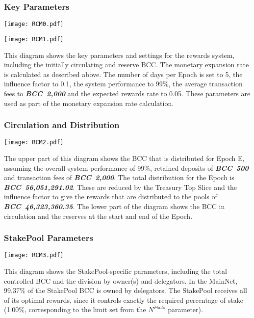 \documentclass[11pt,a4paper,dvipsnames,twosided,final]{article}
\newcommand{\bcc}{BCC{}}
\newcommand{\BCC}[1]{\textbf{\emph{\bcc~{#1}}}}
\newcommand{\bcc}[1]{Bcc}
\begin{document}
\subsubsection*{Key Parameters}

\hspace{-0.65in}\begin{minipage}{\textwidth}
\noindent\texttt{[image: RCM0.pdf]}
\vspace{-7in}

\noindent\texttt{[image: RCM1.pdf]}
\vspace{-3in}
\end{minipage}

\noindent
This diagram shows the key parameters and settings for the rewards system, including the initially
circulating and reserve \bcc{}.  The monetary expansion rate is calculated as described above.
The number of days per Epoch is set to 5, the influence factor to 0.1, the system performance
to 99\%, the average transaction fees to \BCC{2,000} and the expected rewards rate to 0.05.
These parameters are used as part of the monetary expansion rate calculation.


\subsubsection*{Circulation and Distribution}

\hspace{-0.65in}
\texttt{[image: RCM2.pdf]}

\noindent
The upper part of this diagram shows the \bcc{} that is distributed for Epoch E, assuming the overall system performance of 99\%,
retained deposits of \BCC{500} and transaction fees of \BCC{2,000}.  The total distribution for the
Epoch is \BCC{56,051,291.02}.  These are reduced by the Treasury Top Slice and the influence factor
to give the rewards that are distributed to the pools of \BCC{46,323,360.35}.
%
The lower part of the diagram shows the \bcc{} in circulation and the reserves at the start and end of the Epoch.

\subsubsection*{StakePool Parameters}

\hspace{-0.65in}
\texttt{[image: RCM3.pdf]}

\noindent
This diagram shows the StakePool-specific parameters, including the total controlled \bcc{} and the
division by owner(s) and delegators.  In the MainNet, 99.37\% of the StakePool \bcc{} is owned
by delegators.  The StakePool receives all of its optimal rewards, since it controls
exactly the required percentage of stake (1.00\%, corresponding to the limit set from
the $N^{\textit{Pools}}$ parameter).
\end{document}
